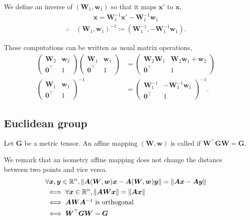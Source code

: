 We define an inverse of $(\bm{W}_{1}, \bm{w}_{1})$ so that it maps $\bm{x}'$ to $\bm{x}$,
\begin{align*}
    \bm{x} = \bm{W}_{1}^{-1}\bm{x}' - \bm{W}_{1}^{-1} \bm{w}_{1}
\end{align*}
\begin{align}
    \therefore \quad
    (\bm{W}_{1}, \bm{w}_{1})^{-1} \coloneqq (\bm{W}_{1}^{-1}, -\bm{W}_{1}^{-1} \bm{w}_{1}).
\end{align}

These computations can be written as usual matrix operations,
\begin{align}
    \begin{pmatrix} \bm{W}_{2} & \bm{w}_{2} \\ \bm{0}^{\top} & 1 \end{pmatrix}
    \begin{pmatrix} \bm{W}_{1} & \bm{w}_{1} \\ \bm{0}^{\top} & 1 \end{pmatrix}
    &=
    \begin{pmatrix} \bm{W}_{2} \bm{W}_{1} & \bm{W}_{2}\bm{w}_{1} + \bm{w}_{2} \\ \bm{0}^{\top} & 1 \end{pmatrix} \\
    \begin{pmatrix} \bm{W}_{1} & \bm{w}_{1} \\ \bm{0}^{\top} & 1 \end{pmatrix}^{-1}
    &=
    \begin{pmatrix} \bm{W}_{1}^{-1} & -\bm{W}_{1}^{-1}\bm{w}_{1} \\ \bm{0}^{\top} & 1 \end{pmatrix}^{-1}.
\end{align}

\subsection{Euclidean group}

\begin{screen}
  \begin{definition}[isometry]
    Let $\bm{G}$ be a metric tensor.
    An affine mapping $(\bm{W}, \bm{w})$ is called  if $\bm{W}^{\top} \bm{G} \bm{W} = \bm{G}$.
  \end{definition}
\end{screen}

We remark that an isometry affine mapping does not change the distance between two points and vice versa.
\begin{align*}
  &\forall \bm{x}, \bm{y} \in \mathbb{R}^{n}, \left\lVert \bm{A} (\bm{W}, \bm{w}) \bm{x} - \bm{A} (\bm{W}, \bm{w}) \bm{y}\right\rVert = \left\lVert\bm{Ax} - \bm{Ay}\right\rVert \\
  &\iff \forall \bm{x} \in \mathbb{R}^{n}, \left\lVert \bm{AW} \bm{x} \right\rVert = \left\lVert\bm{Ax}\right\rVert \\
  &\iff \mbox{$\bm{A} \bm{W} \bm{A}^{-1}$ is orthogonal} \\
  &\iff \bm{W}^{\top} \bm{G} \bm{W} = \bm{G}
\end{align*}

